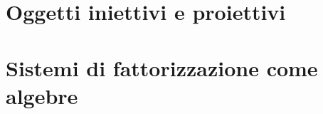 \section[Iniettivi e proiettivi]{Oggetti iniettivi e proiettivi}
\begin{esercizi}
	\item
	\item
	\item
	\item
	\item
\end{esercizi}
\section[Fattorizzazione e algebre]{Sistemi di fattorizzazione come algebre}
\begin{esercizi}
	\item
	\item
	\item
	\item
	\item
\end{esercizi}


